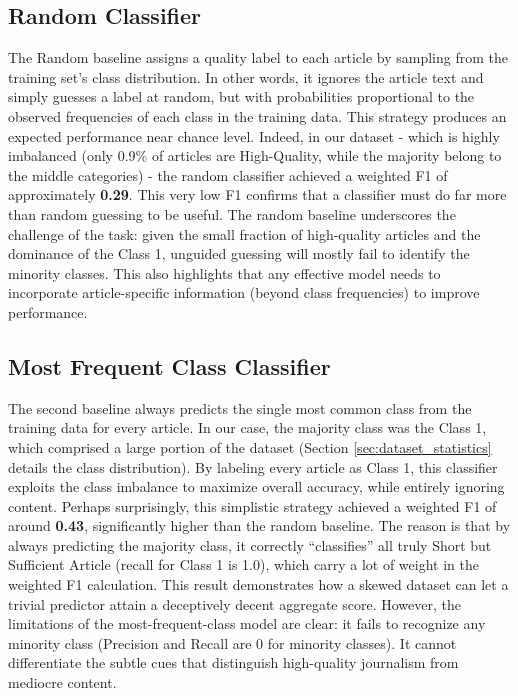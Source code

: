 \subsection{Random Classifier}\label{sec:random_classifier}

The Random baseline assigns a quality label to each article by sampling from the training set's class distribution. In other words, it ignores the article text and simply guesses a label at random, but with probabilities proportional to the observed frequencies of each class in the training data. This strategy produces an expected performance near chance level. Indeed, in our dataset - which is highly imbalanced (only 0.9\% of articles are High-Quality, while the majority belong to the middle categories) - the random classifier achieved a weighted F1 of approximately \textbf{0.29}. This very low F1 confirms that a classifier must do far more than random guessing to be useful. The random baseline underscores the challenge of the task: given the small fraction of high-quality articles and the dominance of the \ac{Class 1}, unguided guessing will mostly fail to identify the minority classes. This also highlights that any effective model needs to incorporate article-specific information (beyond class frequencies) to improve performance.

\subsection{Most Frequent Class Classifier}\label{sec:most_frequent_classifier}

The second baseline always predicts the single most common class from the training data for every article. In our case, the majority class was the \ac{Class 1}, which comprised a large portion of the dataset (Section \ref{sec:dataset_statistics} details the class distribution). By labeling every article as \ac{Class 1}, this classifier exploits the class imbalance to maximize overall accuracy, while entirely ignoring content. Perhaps surprisingly, this simplistic strategy achieved a weighted F1 of around \textbf{0.43}, significantly higher than the random baseline. The reason is that by always predicting the majority class, it correctly “classifies” all truly Short but Sufficient Article (recall for \ac{Class 1} is 1.0), which carry a lot of weight in the weighted F1 calculation. This result demonstrates how a skewed dataset can let a trivial predictor attain a deceptively decent aggregate score. However, the limitations of the most-frequent-class model are clear: it fails to recognize any minority class (Precision and Recall are 0 for minority classes). It cannot differentiate the subtle cues that distinguish high-quality journalism from mediocre content.

